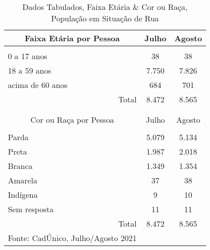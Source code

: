 \documentclass[12pt]{article}
\begin{document}
\begin{table}[htbp]
  \centering
  \caption{Dados Tabulados, Faixa Etária \& Cor ou Raça, População em Situação de Rua}
    \begin{tabular}{p{23.5em}rr}
    \hline
    \multicolumn{1}{c}{Faixa Etária por Pessoa} & \multicolumn{1}{c}{Julho} & \multicolumn{1}{c}{Agosto} \\
    \midrule
    \multicolumn{1}{l}{} &      &  \\
    \multicolumn{1}{l}{0 a 17 anos} & \multicolumn{1}{c}{38} & \multicolumn{1}{c}{38} \\
    \multicolumn{1}{l}{18 a 59 anos} & \multicolumn{1}{c}{7.750} & \multicolumn{1}{c}{7.826} \\
    \multicolumn{1}{l}{acima de 60 anos} & \multicolumn{1}{c}{684} & \multicolumn{1}{c}{701} \\
    \midrule
    \multicolumn{1}{r}{Total} & \multicolumn{1}{c}{8.472} & \multicolumn{1}{c}{8.565} \\
    \midrule
    \multicolumn{1}{r}{} &      &  \\
    \multicolumn{1}{r}{} &      &  \\
    \midrule
    \multicolumn{1}{c}{Cor ou Raça por Pessoa} & \multicolumn{1}{c}{Julho} & \multicolumn{1}{c}{Agosto} \\
    \midrule
    \multicolumn{1}{c}{} &      &  \\
    \multicolumn{1}{l}{Parda} & \multicolumn{1}{c}{5.079} & \multicolumn{1}{c}{5.134} \\
    \multicolumn{1}{l}{Preta} & \multicolumn{1}{c}{1.987} & \multicolumn{1}{c}{2.018} \\
    \multicolumn{1}{l}{Branca} & \multicolumn{1}{c}{1.349} & \multicolumn{1}{c}{1.354} \\
    \multicolumn{1}{l}{Amarela} & \multicolumn{1}{c}{37} & \multicolumn{1}{c}{38} \\
    \multicolumn{1}{l}{Indígena} & \multicolumn{1}{c}{9} & \multicolumn{1}{c}{10} \\
    \multicolumn{1}{l}{Sem resposta} & \multicolumn{1}{c}{11} & \multicolumn{1}{c}{11} \\
    \midrule
    \multicolumn{1}{r}{Total} & \multicolumn{1}{c}{8.472} & \multicolumn{1}{c}{8.565} \\
    \midrule
    Fonte: CadÚnico, Julho/Agosto 2021 &      &  \\
    \end{tabular}%
  \label{tab:tab2}%
\end{table}%
\end{document}
